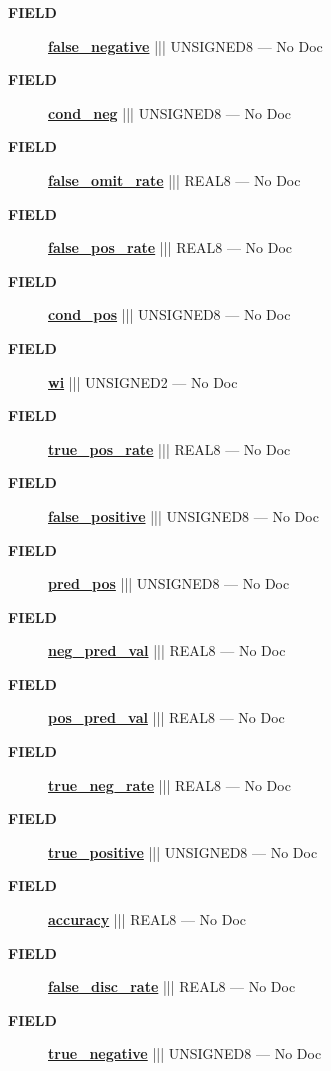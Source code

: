 \par
\begin{description}
\item [\colorbox{tagtype}{\color{white} \textbf{\textsf{FIELD}}}] \textbf{\underline{false\_negative}} ||| UNSIGNED8 --- No Doc
\item [\colorbox{tagtype}{\color{white} \textbf{\textsf{FIELD}}}] \textbf{\underline{cond\_neg}} ||| UNSIGNED8 --- No Doc
\item [\colorbox{tagtype}{\color{white} \textbf{\textsf{FIELD}}}] \textbf{\underline{false\_omit\_rate}} ||| REAL8 --- No Doc
\item [\colorbox{tagtype}{\color{white} \textbf{\textsf{FIELD}}}] \textbf{\underline{false\_pos\_rate}} ||| REAL8 --- No Doc
\item [\colorbox{tagtype}{\color{white} \textbf{\textsf{FIELD}}}] \textbf{\underline{cond\_pos}} ||| UNSIGNED8 --- No Doc
\item [\colorbox{tagtype}{\color{white} \textbf{\textsf{FIELD}}}] \textbf{\underline{wi}} ||| UNSIGNED2 --- No Doc
\item [\colorbox{tagtype}{\color{white} \textbf{\textsf{FIELD}}}] \textbf{\underline{true\_pos\_rate}} ||| REAL8 --- No Doc
\item [\colorbox{tagtype}{\color{white} \textbf{\textsf{FIELD}}}] \textbf{\underline{false\_positive}} ||| UNSIGNED8 --- No Doc
\item [\colorbox{tagtype}{\color{white} \textbf{\textsf{FIELD}}}] \textbf{\underline{pred\_pos}} ||| UNSIGNED8 --- No Doc
\item [\colorbox{tagtype}{\color{white} \textbf{\textsf{FIELD}}}] \textbf{\underline{neg\_pred\_val}} ||| REAL8 --- No Doc
\item [\colorbox{tagtype}{\color{white} \textbf{\textsf{FIELD}}}] \textbf{\underline{pos\_pred\_val}} ||| REAL8 --- No Doc
\item [\colorbox{tagtype}{\color{white} \textbf{\textsf{FIELD}}}] \textbf{\underline{true\_neg\_rate}} ||| REAL8 --- No Doc
\item [\colorbox{tagtype}{\color{white} \textbf{\textsf{FIELD}}}] \textbf{\underline{true\_positive}} ||| UNSIGNED8 --- No Doc
\item [\colorbox{tagtype}{\color{white} \textbf{\textsf{FIELD}}}] \textbf{\underline{accuracy}} ||| REAL8 --- No Doc
\item [\colorbox{tagtype}{\color{white} \textbf{\textsf{FIELD}}}] \textbf{\underline{false\_disc\_rate}} ||| REAL8 --- No Doc
\item [\colorbox{tagtype}{\color{white} \textbf{\textsf{FIELD}}}] \textbf{\underline{true\_negative}} ||| UNSIGNED8 --- No Doc

\end{description}
